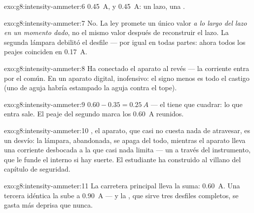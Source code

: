 \begin{solution}{exo:g8:intensity-ammeter:6}
\qty{0.45}{A}, y \qty{0.45}{A}: un lazo, una .
\end{solution}

\begin{solution}{exo:g8:intensity-ammeter:7}
No. La ley promete un único valor \emph{a lo largo del lazo en un
momento dado}, no el mismo valor después de reconstruir el lazo. La
segunda lámpara debilitó el desfile --- por igual en todas partes:
ahora todos los peajes coinciden en \qty{0.17}{A}.
\end{solution}

\begin{solution}{exo:g8:intensity-ammeter:8}
Ha conectado el aparato al revés --- la corriente entra por el
 común. En un aparato digital, inofensivo: el signo menos es
todo el castigo (uno de aguja habría estampado la aguja contra el
tope).
\end{solution}

\begin{solution}{exo:g8:intensity-ammeter:9}
$0.60 - 0.35 = \qty{0.25}{A}$ --- el  tiene que cuadrar: lo
que entra sale. El peaje del segundo  marca los \qty{0.60}{A}
reunidos.
\end{solution}

\begin{solution}{exo:g8:intensity-ammeter:10}
, el aparato, que casi no cuesta nada de atravesar, es
un desvío: la lámpara, abandonada, se apaga del todo, mientras el
aparato lleva una corriente desbocada a la que casi nada limita --- un
 a través del instrumento, que le funde el
 interno si hay suerte. El estudiante ha construido al
villano del capítulo de seguridad.
\end{solution}

\begin{solution}{exo:g8:intensity-ammeter:11}
La carretera principal lleva la suma: \qty{0.60}{A}. Una tercera
 idéntica la sube a \qty{0.90}{A} --- y la , que
sirve tres desfiles completos, se gasta más deprisa que nunca.
\end{solution}

